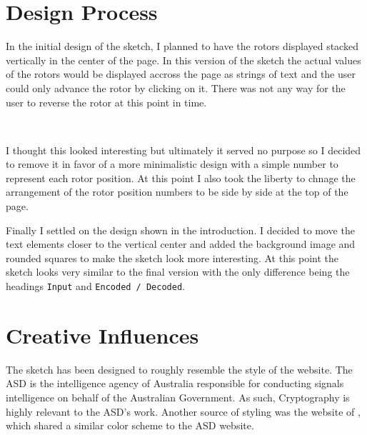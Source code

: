 \documentclass[12pt,a4paper]{article}
\begin{document}
	\section{Design Process}
		In the initial design of the sketch, I planned to have the rotors displayed stacked 
		vertically in the center of the page. In this version of the sketch the actual values 
		of the rotors would be displayed accross the page as strings of text and the user could
		only advance the rotor by clicking on it. There was not any way for the user to reverse 
		the rotor at this point in time.\\

		\begin{center}
			\\
		\end{center}
		\vspace{0.5cm}
		I thought this looked interesting but ultimately it served no purpose so I decided to 
		remove it in favor of a more minimalistic design with a simple number to represent 
		each rotor position. At this point I also took the liberty to chnage the arrangement of 
		the rotor position numbers to be side by side at the top of the page.\\
		
		\begin{center}
			\par
		\end{center}
		\vspace{0.5cm}
		Finally I settled on the design shown in the introduction. I decided to move the text 
		elements closer to the vertical center and added the background image and rounded squares 
		to make the sketch look more interesting. At this point the sketch looks very similar to the 
		final version with the only difference being the headings \texttt{Input} and 
		\texttt{Encoded / Decoded}.\\

		\begin{center}
			\par
		\end{center}
	
	\newpage

	\section{Creative Influences}
		The sketch has been designed to roughly resemble the style of the 
		\textcite{ASD2023} website. The ASD is the intelligence agency of Australia responsible 
		for conducting signals intelligence on behalf of the Australian Government. As such, 
		Cryptography is highly relevant to the ASD's work. Another source of styling was 
		the website of \textcite{QUT2023}, which shared a similar color scheme to the ASD website.\\
		
\end{document}
